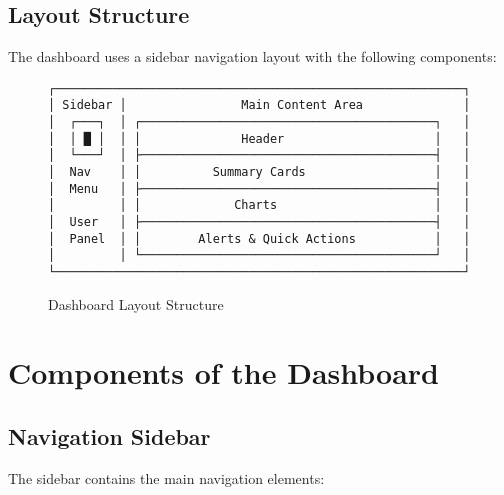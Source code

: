 \documentclass[12pt,a4paper]{report}
\begin{document}
\subsection{Layout Structure}

The dashboard uses a sidebar navigation layout with the following components:

\begin{figure}[H]
\centering
\begin{verbatim}
┌─────────────────────────────────────────────────────────┐
│ Sidebar │                Main Content Area              │
│  ┌───┐  │ ┌─────────────────────────────────────────┐   │
│  │ █ │  │ │              Header                     │   │
│  └───┘  │ ├─────────────────────────────────────────┤   │
│  Nav    │ │          Summary Cards                  │   │
│  Menu   │ ├─────────────────────────────────────────┤   │
│         │ │             Charts                      │   │
│  User   │ ├─────────────────────────────────────────┤   │
│  Panel  │ │        Alerts & Quick Actions           │   │
│         │ └─────────────────────────────────────────┘   │
└─────────────────────────────────────────────────────────┘
\end{verbatim}
\caption{Dashboard Layout Structure}
\end{figure}

\section{Components of the Dashboard}

\subsection{Navigation Sidebar}

The sidebar contains the main navigation elements:
\end{document}

